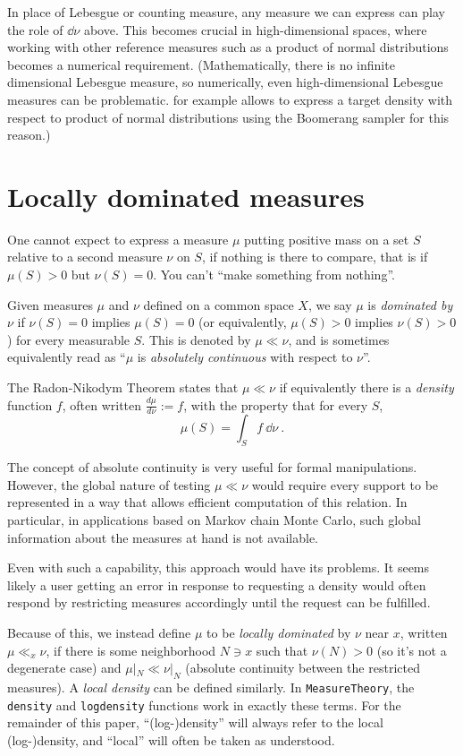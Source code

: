 \documentclass{juliacon}
\begin{document}
 In place of Lebesgue or counting measure, any measure we can express can play the role of $\dd\nu$ above. This becomes crucial in high-dimensional spaces, where working with other reference measures such as a product of normal distributions becomes a numerical requirement. (Mathematically, there is no infinite dimensional Lebesgue measure, so numerically, even  high-dimensional Lebesgue measures can be problematic.
\cite{https://doi.org/10.5281/zenodo.3931118} for example allows to express a target density with respect to product of normal distributions using the Boomerang sampler \cite{pmlr-v119-bierkens20a} for this reason.)
 
\section{Locally dominated measures}
One cannot expect to express a measure $\mu$ putting positive mass on a set $S$ relative to a second measure $\nu$ on $S$, if nothing is there to compare, that is if $\mu(S) > 0$ but $\nu(S) = 0$. You can't ``make something from nothing''.

Given measures $\mu$ and $\nu$ defined on a common space $X$, we say $\mu$ is \emph{dominated by} $\nu$ 
if $\nu(S)=0$ implies $\mu(S)=0$  (or equivalently, $\mu(S)>0$ implies $\nu(S)>0$) for every measurable $S$.
This is denoted by $\mu \ll \nu$, and is sometimes equivalently read as ``$\mu$ is \emph{absolutely continuous} with respect to $\nu$''.

The Radon-Nikodym Theorem states that $\mu \ll \nu$ if equivalently there is a \emph{density} function $f$, often written $\frac{d\mu}{d\nu}:=f$, with the property that for every $S$,
\[
\mu(S) = \int_S f\  \dd\nu \ .
\]

The concept of absolute continuity is very useful for formal manipulations. However, the global nature of testing $\mu \ll \nu$ would require every support to be represented in a way that allows efficient computation of this relation. In particular, in applications based on Markov chain Monte Carlo, such global information about the measures at hand is not available.

Even with such a capability, this approach would have its problems. It seems likely a user getting an error in response to requesting a density would often respond by restricting measures accordingly until the request can be fulfilled.

Because of this, we instead define $\mu$ to be \emph{locally dominated} by $\nu$ near $x$, written $\mu \ll_x \nu$, if there is some neighborhood $N \ni x$ such that $\nu(N)>0$ (so it's not a degenerate case) and $\mu|_N \ll \nu|_N$ (absolute continuity between the restricted measures). A \emph{local density} can be defined similarly. In \verb|MeasureTheory|, the \verb|density| and \verb|logdensity| functions work in exactly these terms. For the remainder of this paper, ``(log-)density'' will always refer to the local (log-)density, and ``local'' will often be taken as understood.
\end{document}
